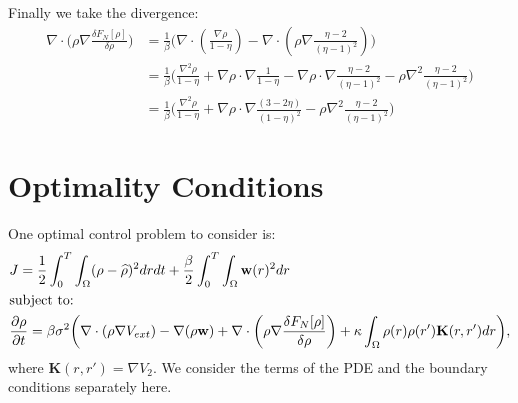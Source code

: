 \documentclass[11pt, a4paper]{article}
\theoremstyle{definition}
\newcommand{\w}{\mathbf{w}}
\newcommand{\K}{\mathbf{K}}
\begin{document}
Finally we take the divergence:
\begin{align*}
	\nabla \cdot \bigg(\rho \nabla \frac{\delta F_{N}[\rho]}{\delta \rho}\bigg) &= \frac{1}{\beta} \bigg( \nabla  \cdot \left(  \frac{\nabla \rho}{1 - \eta} \right) - \nabla  \cdot \left(\rho \nabla\frac{\eta - 2}{(\eta - 1)^2} \right) \bigg)\\
	&= \frac{1}{\beta} \bigg( \frac{\nabla^2 \rho}{1 - \eta} +  \nabla \rho \cdot \nabla \frac{1}{1 - \eta} - \nabla \rho \cdot \nabla \frac{\eta - 2}{(\eta - 1)^2} - \rho \nabla^2\frac{\eta - 2}{(\eta - 1)^2} \bigg)\\
	&= \frac{1}{\beta} \bigg( \frac{\nabla^2 \rho}{1 - \eta} +  \nabla \rho \cdot \nabla \frac{(3- 2 \eta)}{(1 - \eta)^2}  - \rho \nabla^2\frac{\eta - 2}{(\eta - 1)^2} \bigg)
\end{align*}

\section{Optimality Conditions}
One optimal control problem to consider is:
\begin{align}\label{eq:OCP1}
	&J = \frac{1}{2}\int_0^T \int_\Omega (\rho - \widehat \rho)^2 dr dt + \frac{\beta}{2} \int_0^T\int_\Omega \w(r)^2 dr \notag\\
	&\text{subject to:}\\
	&\frac{\partial \rho}{\partial t} = \beta \sigma^2 \bigg( \nabla \cdot (\rho \nabla V_{ext}) - \nabla (\rho \w) + \nabla \cdot \left(\rho \nabla \frac{\delta F_{N}[\rho]}{\delta \rho}\right) + \kappa \int_\Omega \rho(r) \rho(r') \K(r,r')dr\bigg), \notag
\end{align}
where $\K(r,r') = \nabla V_2$.
We consider the terms of the PDE and the boundary conditions separately here.
\end{document}
